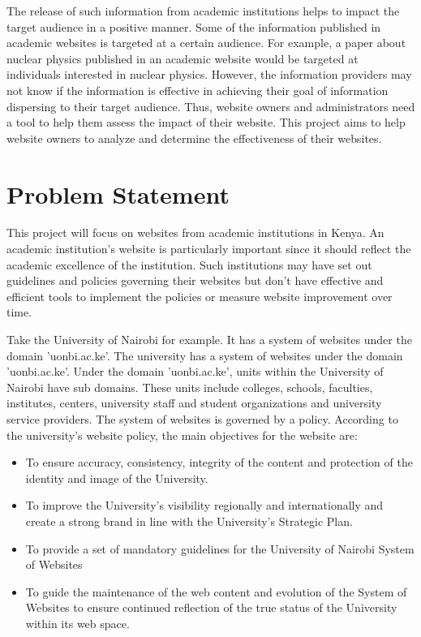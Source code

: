 \noindent
The release of such information from academic institutions helps to impact the target audience in a positive manner. Some of the information published in academic websites is targeted at a certain audience. For example, a paper about nuclear physics published in an academic website would be targeted at individuals interested in nuclear physics. However, the information providers may not know if the information is effective in achieving their goal of information dispersing to their target audience. Thus, website owners and administrators need a tool to help them assess the impact of their website. This project aims to help website owners to analyze and determine the effectiveness of their websites.


\section{Problem Statement}
This project will focus on websites from academic institutions in Kenya. An academic institution's website is particularly important since it should reflect the academic excellence of the institution. Such institutions may have set out guidelines and policies governing their websites but don't have effective and efficient tools to implement the policies or measure website improvement over time. 

\noindent
Take the University of Nairobi for example. It has a system of websites under the domain 'uonbi.ac.ke'. The university has a system of websites under the domain 'uonbi.ac.ke'. Under the domain 'uonbi.ac.ke', units within the  University of Nairobi have sub domains. These units include colleges, schools, faculties, institutes, centers, university staff and student organizations and university service providers. The system of websites is governed by a policy. According to the university's website policy, the main objectives for the website are:
\begin{itemize}
\item To ensure accuracy, consistency, integrity of the content and protection of the identity and image of the University.
\item To improve the University's visibility regionally and internationally and create a strong brand in line with the University's Strategic Plan.
\item To provide a set of mandatory guidelines for the University of Nairobi System of Websites
\item To guide the maintenance of the web content and evolution of the System of Websites to ensure continued reflection of the true status of the University within its web space.
\end{itemize}

